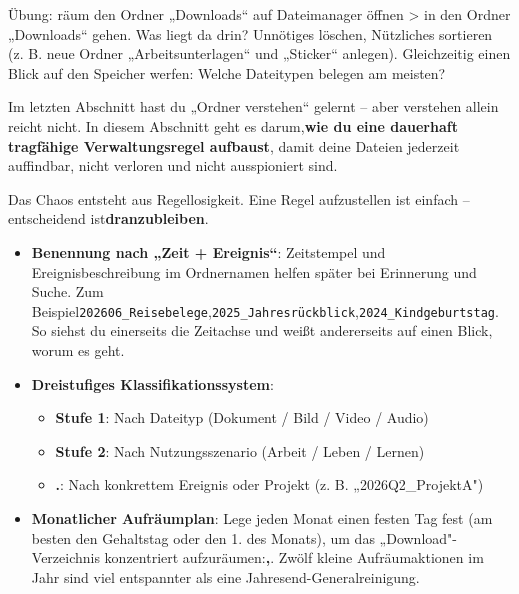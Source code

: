 \begin{tcbpractice}{Übung: räum den Ordner „Downloads“ auf}
Dateimanager öffnen > in den Ordner „Downloads“ gehen. Was liegt da drin? Unnötiges löschen, Nützliches sortieren (z. B. neue Ordner „Arbeitsunterlagen“ und „Sticker“ anlegen). Gleichzeitig einen Blick auf den Speicher werfen: Welche Dateitypen belegen am meisten?

\end{tcbpractice}


Im letzten Abschnitt hast du „Ordner verstehen“ gelernt – aber verstehen allein reicht nicht. In diesem Abschnitt geht es darum,\textbf{wie du eine dauerhaft tragfähige Verwaltungsregel aufbaust}, damit deine Dateien jederzeit auffindbar, nicht verloren und nicht ausspioniert sind.


Das Chaos entsteht aus Regellosigkeit. Eine Regel aufzustellen ist einfach – entscheidend ist\textbf{dranzubleiben}.

\begin{itemize}
  \item \textbf{Benennung nach „Zeit + Ereignis“}: Zeitstempel und Ereignisbeschreibung im Ordnernamen helfen später bei Erinnerung und Suche. Zum Beispiel\texttt{202606\_Reisebelege},\texttt{2025\_Jahresrückblick},\texttt{2024\_Kindgeburtstag}. So siehst du einerseits die Zeitachse und weißt andererseits auf einen Blick, worum es geht.
  \item \textbf{Dreistufiges Klassifikationssystem}:
  \begin{itemize}
    \item \textbf{Stufe 1}: Nach Dateityp (Dokument / Bild / Video / Audio)
    \item \textbf{Stufe 2}: Nach Nutzungsszenario (Arbeit / Leben / Lernen)
    \item \textbf{.}: Nach konkrettem Ereignis oder Projekt (z. B. „2026Q2\_ProjektA")
  \end{itemize}
  \item \textbf{Monatlicher Aufräumplan}: Lege jeden Monat einen festen Tag fest (am besten den Gehaltstag oder den 1. des Monats), um das „Download"-Verzeichnis konzentriert aufzuräumen:\textbf{,}. Zwölf kleine Aufräumaktionen im Jahr sind viel entspannter als eine Jahresend-Generalreinigung.
\end{itemize}

